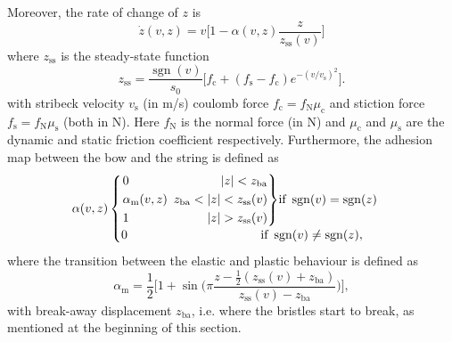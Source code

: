 \documentclass[twoside,a4paper]{article}
\newenvironment{rcases}
  {\left.\begin{alignedat}{2}}
  {\end{alignedat}\right\rbrace}
\DeclareMathOperator{\sgn}{sgn}
\begin{document}
Moreover, the rate of change of $z$ is
\begin{equation}\label{eq:zdot}
    \dot z(v, z) = v\bigg[1-\alpha(v, z)\frac{z}{z_\text{ss}(v)}\bigg]
\end{equation}
where $z_\text{ss}$ is the steady-state function
\begin{equation}
    z_\text{ss} = \frac{\sgn(v)}{s_0}\Big[f_\text{c}+(f_\text{s}-f_\text{c})e^{-(v/v_\text{s})^2}\Big].
\end{equation}
with stribeck velocity $v_\text{s}$ (in m/s) coulomb force $f_\text{c} = f_\text{N}\mu_\text{c}$ and stiction force $f_\text{s} = f_\text{N}\mu_\text{s}$ (both in N). Here $f_\text{N}$ is the normal force (in N) and $\mu_\text{c}$ and $\mu_\text{s}$ are the dynamic and static friction coefficient respectively. 
Furthermore, the adhesion map between the bow and the string is defined as
\begin{equation}
\alpha(v, z) 
    \begin{cases}
    \begin{rcases}
        &0 & |z| < z_\text{ba}\\
       &\alpha_\text{m}(v,z)&\ \, z_\text{ba}<|z|<z_\text{ss}(v)\\
        &1 &|z|>z_\text{ss}(v)
        \end{rcases}\text{if}\  \sgn(v)=\sgn(z)\\
        0\hspace{107pt}\text{if}\  \sgn(v)\neq\sgn(z),
    \end{cases}
\end{equation}
where the transition between the elastic and plastic behaviour is defined as
\begin{equation}
    \alpha_\text{m} = \frac{1}{2}\bigg[1+\sin\bigg(\pi\frac{z-\frac{1}{2}(z_\text{ss}(v)+z_\text{ba})}{z_\text{ss}(v)-z_\text{ba}}\bigg)\bigg],
\end{equation}
with break-away displacement $z_\text{ba}$, i.e. where the bristles start to break, as mentioned at the beginning of this section.
\end{document}
